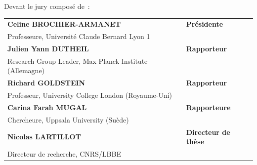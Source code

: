 Devant le jury composé de~:\\

\small {
\begin{tabular}{ll}
    \textbf{Celine BROCHIER-ARMANET} & \textbf{Présidente}         \\
    Professeure, Université Claude Bernard Lyon 1 \\
    \textbf{Julien Yann DUTHEIL}     & \textbf{Rapporteur}         \\
    Research Group Leader, Max Planck Institute (Allemagne) \\
    \textbf{Richard GOLDSTEIN}       & \textbf{Rapporteur}         \\
    Professeur, University College London (Royaume-Uni) \\
    \textbf{Carina Farah MUGAL}      & \textbf{Rapporteure}        \\
    Chercheure, Uppsala University (Suède) \\
    \textbf{Nicolas LARTILLOT}       & \textbf{Directeur de thèse} \\
    Directeur de recherche, CNRS/LBBE \\
\end{tabular}
}
